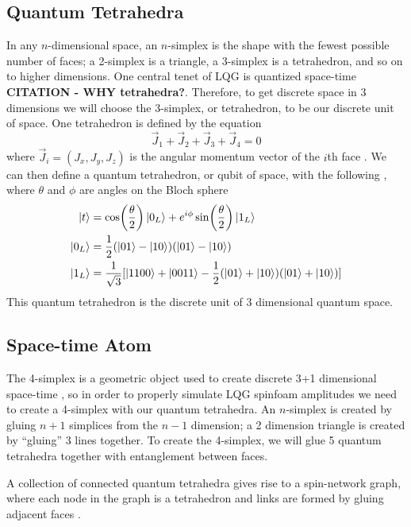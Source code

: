 \documentclass[a4paper,11pt,aps,tightenlines,nofootinbib]{revtex4}
\begin{document}
\subsection{Quantum Tetrahedra}
        In any $n$-dimensional space, an $n$-simplex is the shape with the fewest possible number of faces; a 
        2-simplex is a triangle, a 3-simplex is a tetrahedron, and so on to higher dimensions. One central tenet 
        of LQG is quantized space-time \textbf{CITATION - WHY tetrahedra?}. Therefore, to get discrete space in 3 dimensions
        we will choose the 3-simplex, or tetrahedron, to be our discrete unit of space. One tetrahedron is defined by the 
        equation 
        \begin{equation} 
                \vec J_1 + \vec J_2 + \vec J_3 + \vec J_4 = 0
        \end{equation}
        where $\vec J_i = (J_x,J_y,J_z)$ is the angular momentum vector of the $i$th face \cite{covariant-lqg}. We can then define 
        a quantum tetrahedron, or qubit of space, with the following \cite{qspacetime-on-qsim}, where $\theta$ and $\phi$ are 
        angles on the Bloch sphere 
        \begin{align}
                \ket{t} &= \cos(\frac{\theta}{2})\ket{0_L} + e^{i\phi}\sin(\frac{\theta}{2}) \ket{1_L}\\
                \ket{0_L} &= \frac{1}{2}(\ket{01}-\ket{10})(\ket{01}-\ket{10})\\
                \ket{1_L} &= \frac{1}{\sqrt{3}}[\ket{1100}+\ket{0011}-\frac{1}{2}(\ket{01}+\ket{10})(\ket{01}+\ket{10})]
        \end{align}
        This quantum tetrahedron is the discrete unit of 3 dimensional quantum space.

\subsection{Space-time Atom}
        The 4-simplex is a geometric object used to create discrete 3+1 dimensional space-time \cite{simplical-decomp}, so in order to 
        properly simulate LQG spinfoam amplitudes we need to create a 4-simplex with our quantum tetrahedra.
        An $n$-simplex is created by gluing $n+1$ simplices from the $n-1$ dimension; a 2 dimension triangle is created by ``gluing'' 3 lines 
        together. To create the 4-simplex, we will glue 5 quantum tetrahedra together with entanglement between faces. 

A collection of connected quantum tetrahedra gives rise to a spin-network graph, where each node in the graph is a tetrahedron and links are formed by gluing adjacent faces \cite{gluing-polyhedra}. 
\end{document}
